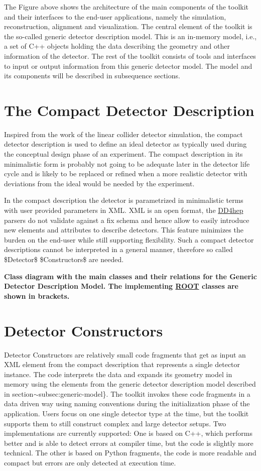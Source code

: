 The Figure above shows the architecture of the main components of the toolkit and their interfaces to the end-\/user applications, namely the simulation, reconstruction, alignment and visualization. The central element of the toolkit is the so-\/called generic detector description model. This is an in-\/memory model, i.\+e., a set of C++ objects holding the data describing the geometry and other information of the detector. The rest of the toolkit consists of tools and interfaces to input or output information from this generic detector model. The model and its components will be described in subsequence sections.\hypertarget{index_COMPACT}{}\section{The Compact Detector Description}\label{index_COMPACT}
Inspired from the work of the linear collider detector simulation, the compact detector description is used to define an ideal detector as typically used during the conceptual design phase of an experiment. The compact description in its minimalistic form is probably not going to be adequate later in the detector life cycle and is likely to be replaced or refined when a more realistic detector with deviations from the ideal would be needed by the experiment.

In the compact description the detector is parametrized in minimalistic terms with user provided parameters in X\+ML. X\+ML is an open format, the \hyperlink{namespace_d_d4hep}{D\+D4hep} parsers do not validate against a fix schema and hence allow to easily introduce new elements and attributes to describe detectors. This feature minimizes the burden on the end-\/user while still supporting flexibility. Such a compact detector descriptions cannot be interpreted in a general manner, therefore so called \$\+Detector\$ \$\+Constructors\$ are needed.

 {\bfseries Class diagram with the main classes and their relations for the Generic Detector Description Model. The implementing \hyperlink{namespace_r_o_o_t}{R\+O\+OT} classes are shown in brackets. }\hypertarget{index_DETECTORS}{}\section{Detector Constructors}\label{index_DETECTORS}
Detector Constructors are relatively small code fragments that get as input an X\+ML element from the compact description that represents a single detector instance. The code interprets the data and expands its geometry model in memory using the elements from the generic detector description model described in section$\sim$subsec\+:generic-\/model\}. The toolkit invokes these code fragments in a data driven way using naming conventions during the initialization phase of the application. Users focus on one single detector type at the time, but the toolkit supports them to still construct complex and large detector setups. Two implementations are currently supported\+: One is based on C++, which performs better and is able to detect errors at compiler time, but the code is slightly more technical. The other is based on Python fragments, the code is more readable and compact but errors are only detected at execution time.

